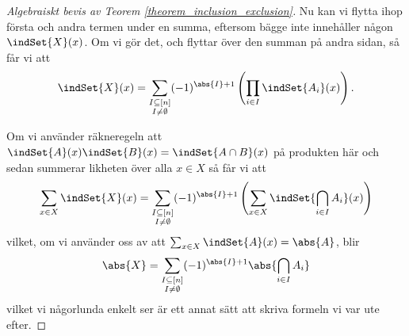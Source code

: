 \documentclass[nobib]{tufte-handout}
\begin{document}
\begin{proof}[Algebraiskt bevis av Teorem \ref{theorem_inclusion_exclusion}]
  Nu kan vi flytta ihop första och andra termen under en summa, eftersom bägge inte innehåller någon $\indSet{X}(x)$. Om vi gör det, och flyttar över den summan på andra sidan, så får vi att
  $$\indSet{X}(x) = \sum_{\substack{I \subseteq [n]\\I \neq \emptyset}} (-1)^{\abs{I} + 1}\left(\prod_{i\in I} \indSet{A_i}(x)\right).$$

  Om vi använder räkneregeln att $\indSet{A}(x)\indSet{B}(x) = \indSet{A\cap B}(x)$ på produkten här och sedan summerar likheten över alla $x\in X$ så får vi att
  $$\sum_{x\in X} \indSet{X}(x) = \sum_{\substack{I \subseteq [n]\\I \neq \emptyset}} (-1)^{\abs{I} + 1}\left(\sum_{x\in X} \indSet{\bigcap_{i\in I} A_i}(x)\right)$$
  vilket, om vi använder oss av att $\sum_{x\in X} \indSet{A}(x) = \abs{A}$, blir
  $$\abs{X} = \sum_{\substack{I \subseteq [n]\\I \neq \emptyset}} (-1)^{\abs{I} + 1}\abs{\bigcap_{i\in I} A_i}$$
  vilket vi någorlunda enkelt ser är ett annat sätt att skriva formeln vi var ute efter.
\end{proof}
\end{document}
